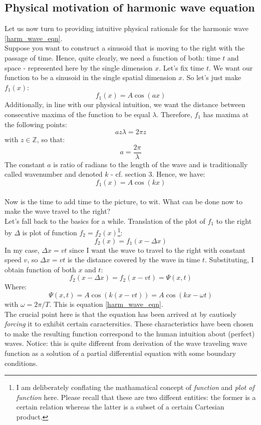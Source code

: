 \documentclass[12pt]{article}
\begin{document}
\subsection{Physical motivation of harmonic wave equation}
Let us now turn to providing intuitive physical rationale for the harmonic wave \eqref{harm_wave_eqn}. 
\\ \indent Suppose you want to construct a sinusoid that is
 moving to the right with the passage of time. Hence, quite clearly, we need a function of both: time $t$ and space - represented here by the single dimension $x$.
Let's fix time $t$. We want our function to be a sinusoid in the single spatial dimension $x$. So let's just make $f_1(x)$:
\begin{equation}
f_1(x) = A \cos(ax)
\end{equation} 
Additionally, in line with our physical intuition, we want the distance between consecutive maxima of the function to be equal $\lambda$. Therefore, $f_1$ has maxima at the following points:
$$ a z \lambda = 2 \pi z $$
with $z \in \mathbb{Z}$, so that:
$$ a = \frac{2\pi}{\lambda}$$ 
The constant $a$ is ratio of radians to the length of the wave and is traditionally called wavenumber and denoted $k$ - cf. section 3. Hence, we have:
$$ f_1(x) = A \cos (kx) $$
\\ \indent Now is the time to add time to the picture, to wit.
What can be done now to make the wave travel to the right? 
\\ \indent
Let's fall back to the basics for a while. Translation of the plot of $f_1$ to the right by $\Delta$ is plot of function $f_2 = f_2(x)$\footnote{I am deliberately conflating the mathamatical concept of \textit{function} and
\textit{plot of function} here. Please recall that these are two diffeent entities: the former is a certain relation whereas the latter is a subset of a certain Cartesian product. }:
$$ f_2(x) = f_1(x - \Delta x) $$
In my case, $\Delta x = vt$ since I want the wave to travel to the right with 
constant speed $v$, so $\Delta x = vt$ is the distance covered by the wave in
 time $t$. Substituting, I obtain function of both $x$ and $t$:
\begin{equation*}
f_2(x - \Delta x) = f_2(x - vt) = \Psi(x, t)
\end{equation*}
Where:
\begin{equation*}
\Psi(x, t) = A \cos \left( k(x - vt)\right) = A \cos(kx - \omega t)
\end{equation*}
with $\omega = 2 \pi / T$. This is equation \eqref{harm_wave_eqn}.
\\ \indent The crucial point here is that the equation has been arrived at by 
cautiosly \textit{forcing} it to exhibit certain caractersitics. These characteristics have 
been chosen to make the resulting function correspond to the human intuition 
about (perfect) waves. Notice: this is quite different from  derivation 
of the wave traveling wave function as a solution of a partial differential equation with some boundary conditions.
\end{document}
